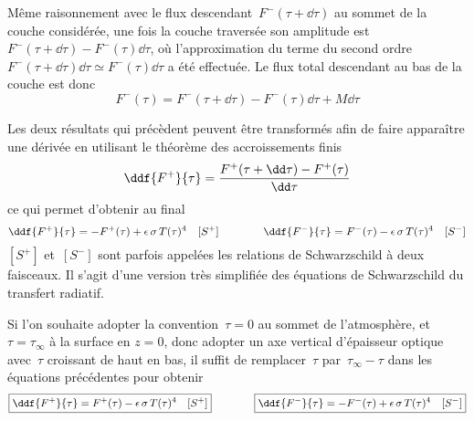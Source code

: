 \sk
Même raisonnement avec le flux descendant~$F^-(\tau+\dd\tau)$ au sommet de la couche considérée,
une fois la couche traversée son amplitude est~$F^-(\tau+\dd\tau) - F^-(\tau) \dd\tau$, où 
l'approximation du terme du second ordre~$F^-(\tau+\dd\tau) \dd\tau \simeq F^-(\tau) \dd\tau$
a été effectuée.
Le flux total descendant au bas de la couche est donc
\[
F^-(\tau) = F^-(\tau+\dd\tau) - F^-(\tau) \dd\tau + M\dd\tau
\]

\sk
Les deux résultats qui précèdent peuvent être transformés 
afin de faire apparaître une dérivée
en utilisant le théorème des accroissements finis
\[
\ddf{F^+}{\tau} = \frac{F^+(\tau+\dd\tau) - F^+(\tau)}{\dd\tau}
\]
\noindent ce qui permet d'obtenir au final
\[
\ddf{F^+}{\tau} = - F^+(\tau) + \epsilon\,\sigma\,T(\tau)^4 \quad [S^+]
\qquad\qquad 
\ddf{F^-}{\tau} = F^-(\tau) - \epsilon\,\sigma\,T(\tau)^4 \quad [S^-]
\]
\noindent $[S^+]$ et~$[S^-]$ sont parfois appelées les relations de Schwarzschild à deux faisceaux.
Il s'agit d'une version très simplifiée des équations de Schwarzschild du transfert radiatif.

\sk
Si l'on souhaite adopter la convention~$\tau=0$ au sommet de l'atmosphère,
et $\tau=\tau_{\infty}$ à la surface en $z=0$, donc adopter un axe
vertical d'épaisseur optique avec~$\tau$ croissant de haut en bas, il
suffit de remplacer~$\tau$ par~$\tau_{\infty}-\tau$ dans les équations précédentes pour obtenir
\[
\boxed{\ddf{F^+}{\tau} = F^+(\tau) - \epsilon\,\sigma\,T(\tau)^4 \quad [S^+]} 
\qquad\qquad 
\boxed{\ddf{F^-}{\tau} = -F^-(\tau) + \epsilon\,\sigma\,T(\tau)^4 \quad [S^-]}
\]







